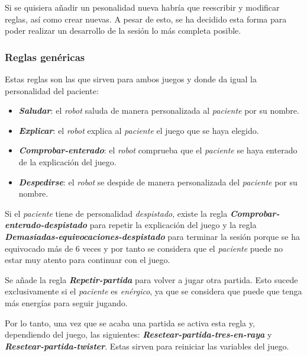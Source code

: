\documentclass{uc3mpracticas}
\begin{document}
  \vspace{1mm}

  Si se quisiera añadir un pesonalidad nueva habría que reescribir y modificar reglas, así como crear nuevas. A pesar de esto, se ha decidido esta forma para poder realizar un desarrollo de la sesión lo más completa posible.

  \subsubsection{Reglas genéricas}

  Estas reglas son las que sirven para ambos juegos y donde da igual la personalidad del paciente:

  \begin{itemize}
    \item \textbf{\textit{Saludar}}: el \textit{robot} saluda de manera personalizada al \textit{paciente} por su nombre.
    \item \textbf{\textit{Explicar}}: el \textit{robot} explica al \textit{paciente} el juego que se haya elegido.
    \item \textbf{\textit{Comprobar-enterado}}: el \textit{robot} comprueba que el \textit{paciente} se haya enterado de la explicación del juego.
    \item \textbf{\textit{Despedirse}}: el \textit{robot} se despide de manera personalizada del \textit{paciente} por su nombre.
  \end{itemize}

  Si el \textit{paciente} tiene de personalidad \textit{despistado}, existe la regla \textbf{\textit{Comprobar-enterado-despistado}} para repetir la explicación del juego y la regla \textbf{\textit{Demasiadas-equivocaciones-despistado}} para terminar la sesión porque se ha equivocado más de 6 veces y por tanto se considera que el \textit{paciente} puede no estar muy atento para continuar con el juego.

  \vspace{3mm}

  Se añade la regla \textbf{\textit{Repetir-partida}} para volver a jugar otra partida. Esto sucede exclusivamente si el \textit{paciente} es \textit{enérgico}, ya que se considera que puede que tenga más energías para seguir jugando.

  \vspace{1mm}

  Por lo tanto, una vez que se acaba una partida se activa esta regla y, dependiendo del juego, las siguientes: \textbf{\textit{Resetear-partida-tres-en-raya}} y \textbf{\textit{Resetear-partida-twister}}. Estas sirven para reiniciar las variables del juego.
\end{document}

